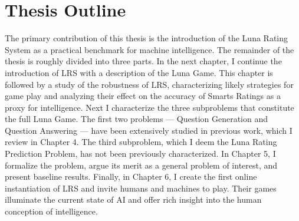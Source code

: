 \section{Thesis Outline}
The primary contribution of this thesis is the introduction of the Luna Rating System as a practical benchmark for machine intelligence. The remainder of the thesis is roughly divided into three parts. In the next chapter, I continue the introduction of LRS with a description of the Luna Game. This chapter is followed by a study of the robustness of LRS, characterizing likely strategies for game play and analyzing their effect on the accuracy of Smarts Ratings as a proxy for intelligence. Next I characterize the three subproblems that constitute the full Luna Game. The first two problems --- Question Generation and Question Answering --- have been extensively studied in previous work, which I review in Chapter 4. The third subproblem, which I deem the Luna Rating Prediction Problem, has not been previously characterized. In Chapter 5, I formalize the problem, argue its merit as a general problem of interest, and present baseline results. Finally, in Chapter 6, I create the first online instantiation of LRS and invite humans and machines to play. Their games illuminate the current state of AI and offer rich insight into the human conception of intelligence.

